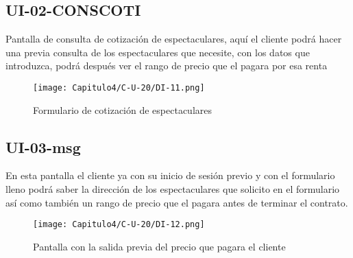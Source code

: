 





\subsection{UI-02-CONSCOTI}
Pantalla de consulta de cotización de espectaculares, aquí el cliente podrá hacer una previa consulta de los espectaculares que necesite, con los datos que introduzca, podrá después ver el rango de precio que el pagara por esa renta
\begin{figure}[htbp!]
\centering
    \texttt{[image: Capitulo4/C-U-20/DI-11.png]}
    \caption{Formulario de cotización de espectaculares}
    \label{fig:my_label}
\end{figure}
\clearpage



\subsection{UI-03-msg}
En esta pantalla el cliente ya con su inicio de sesión previo y con el formulario lleno podrá saber la dirección de los espectaculares que solicito en el formulario así como también un rango de precio que el pagara antes de terminar el contrato.
\begin{figure}[htbp!]
\centering
    \texttt{[image: Capitulo4/C-U-20/DI-12.png]}
    \caption{Pantalla con la salida previa del precio que pagara el cliente}
    \label{fig:my_label}
\end{figure}
\clearpage


